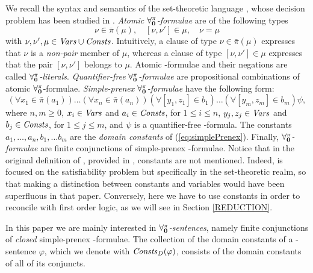\documentclass[manyauthors]{fundam}
\newcommand{\pairin}[3]{\left[#1,#2\right] \in #3}
\newcommand{\nonpairin}[2]{#1 \in \bar{\pi}(#2)}
\newcommand{\seteq}[2]{#1=#2}
\newcommand{\DomConsts}{\Consts_D}
\begin{document}
We recall the syntax and semantics of the set-theoretic
language \Forallpizero, whose decision problem has been studied in 
\cite{CanLonNic2011}.
\emph{Atomic }$\mathbf{\forall_{0}^{\pi}}$\emph{-formulae} are of the following types
\begin{equation}\label{ATFORM}
    \nonpairin{\nu}{\mu}, \quad \pairin{\nu}{\nu'}{\mu}, \quad \seteq{\nu}{\mu}
\end{equation}
with $\nu, \nu', \mu \in \mathit{Vars} \cup \mathit{Consts}$. Intuitively,
a clause of type $\nonpairin{\nu}{\mu}$
expresses that $\nu$ is a \emph{non-pair} member of $\mu$,
whereas a clause of type $[\nu, \nu'] \in \mu$ expresses
that the pair $[\nu, \nu']$ belongs to $\mu$. Atomic
\Forallpizero-formulae and their negations are called
$\mathbf{\forall_{0}^{\pi}}$\emph{-literals}. \emph{Quantifier-free }
$\mathbf{\forall_{0}^{\pi}}$\emph{-formulae} are propositional combinations of atomic
$\mathbf{\forall_{0}^{\pi}}$-formulae. \emph{Simple-prenex }$\mathbf{\forall_{0}^{\pi}}$\emph{-formulae}
have the following form:
\begin{equation}\label{eq:simplePrenex}
  (\forall \nonpairin{x_1}{a_1})\ldots(\forall 
\nonpairin{x_n}{a_n})(\forall \pairin{y_1}{z_1}{b_1})\ldots(\forall 
\pairin{y_m}{z_m}{b_m})\psi,
\end{equation}
where $n, m \geq 0$, $x_i \in \mathit{Vars}$ and
$a_i \in \mathit{Consts}$, for $1 \leq i \leq n$,
$y_j, z_j \in \mathit{Vars}$ and $b_j \in \mathit{Consts}$, for
$1 \leq j \leq m$, and $\psi$ is a quantifier-free
\Forallpizero-formula. The constants $a_1, \ldots, a_n, b_1, \ldots b_m$
are the \emph{domain constants} of (\ref{eq:simplePrenex}).
Finally, $\mathbf{\forall_{0}^{\pi}}$\emph{-formulae} are finite
conjunctions of simple-prenex \Forallpizero-formulae.
Notice that in the original definition of
\Forallpizero,
provided in \cite{CanLonNic2011}, constants are not mentioned.
Indeed, \cite{CanLonNic2011} is focused on the satisfiability
problem but specifically in the set-theoretic realm, so that
making a distinction between constants and variables would have been 
superfluous in that paper.
Conversely, here we have to use constants in order to 
reconcile \Forallpizero with first order logic, as we will
see in Section \ref{REDUCTION}. 

In this paper we are mainly interested in 
$\mathbf{\forall_{0}^{\pi}}$\emph{-sentences}, namely finite conjunctions of 
\emph{closed} simple-prenex \Forallpizero-formulae.
The collection of the domain constants of a
\Forallpizero-sentence $\varphi$, which we denote with $\DomConsts(\varphi)$,
consists of the domain constants of all of its conjuncts.
\end{document}
